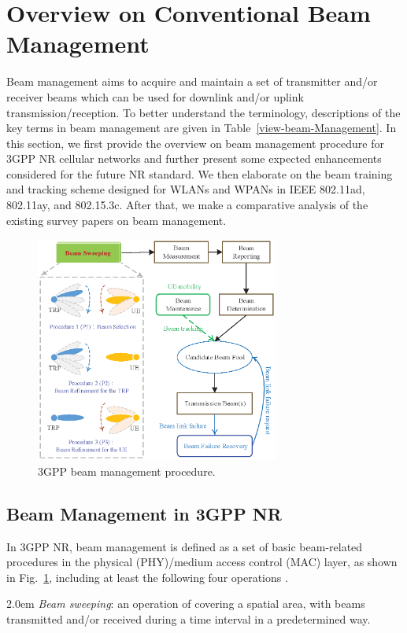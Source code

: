 \documentclass[journal,comsoc]{IEEEtran}
\begin{document}
\section{Overview on Conventional Beam Management}
Beam management aims to acquire and maintain a set of transmitter and/or receiver beams which can be used for downlink and/or uplink transmission/reception. To better understand the terminology, descriptions of the key terms in beam management are given in Table~\ref{view-beam-Management}. In this section, we first provide the overview on beam management procedure for 3GPP NR cellular networks and further present some expected enhancements considered for the future NR standard. We then elaborate on the beam training and tracking scheme designed for WLANs and WPANs in IEEE 802.11ad, 802.11ay, and 802.15.3c. After that, we make a comparative analysis of the existing survey papers on beam management.



\begin{figure}[t]
	\centering
	\includegraphics[width=8cm]{3GPP-BM.eps}
	\caption{3GPP beam management procedure.}
	\label{fig:3GPP-BM}
\end{figure}

\subsection{Beam Management in 3GPP NR}
In 3GPP NR, beam management is defined as a set of basic beam-related procedures in the physical (PHY)/medium access control (MAC) layer, as shown in Fig.~\ref{fig:3GPP-BM}, including at least the following four operations \cite{3GPP-TR-38802}.

\hangindent 2.0em
\checkmark \emph{Beam sweeping}: an operation of covering a spatial area, with beams transmitted and/or received during a time interval in a predetermined way.
\end{document}
